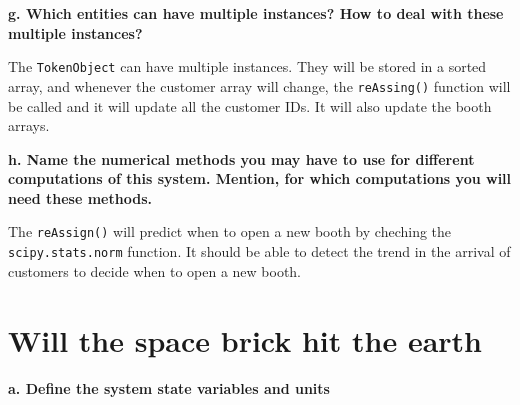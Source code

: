 \documentclass[article, 12pt, a4paper]{memoir}
\begin{document}
\textbf{g. Which entities can have multiple instances? How to deal with these multiple
instances?}
\vspace{1em}

\begin{solution}
    [g]
    The \texttt{TokenObject} can have multiple instances. They will be stored in a sorted
    array, and whenever the customer array will change, the \texttt{reAssing()} function
    will be called and it will update all the customer IDs. It will also update the booth
    arrays.
\end{solution}


\textbf{h. Name the numerical methods you may have to use for different computations of
this system. Mention, for which computations you will need these methods.}
\vspace{1em}

\begin{solution}
    [h]
    The \texttt{reAssign()} will predict when to open a new booth by cheching the
    \texttt{scipy.stats.norm} function. It should be able to detect the trend in the
    arrival of customers to decide when to open a new booth.
\end{solution}


\newpage
\chapter{Will the space brick hit the earth}

\textbf{a. Define the system state variables and units}
\vspace{1em}
\end{document}
